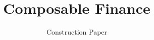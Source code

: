 \documentclass{article}
\title{Composable Finance}
\author{Construction Paper}
\begin{document}
\maketitle
\tableofcontents
\pagebreak

\pagebreak


\pagebreak

% 
% 

% 




\end{document}
